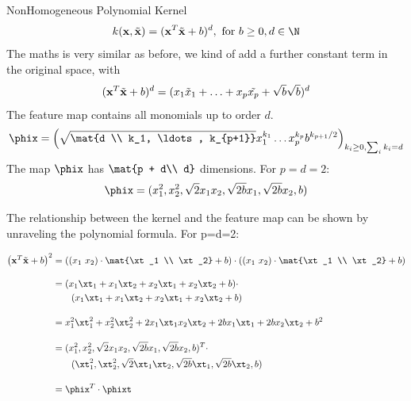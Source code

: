 \documentclass[11pt,compress,t,notes=noshow, xcolor=table]{beamer}
\begin{document}
\begin{vbframe}{NonHomogeneous Polynomial Kernel}
 $$k(\xv, \xtil) = (\xv^T \xtil + b)^d, \text{ for } b\geq 0, d \in \N$$
The maths is very similar as before, we kind of add a further constant term in the original space, with
$$ (\mathbf{x}^T \tilde{\mathbf{x}} + b)^d = (x_1 \tilde{x}_1 + \ldots + x_p \tilde{x_p} + \sqrt{b} \sqrt{b})^d$$
The feature map contains all monomials up to order $d$.
  $$\phix = \left( \sqrt{\mat{d \\ k_1, \ldots, k_{p+1}}} x_1^{k_1} \ldots x_p^{k_p} b^{k_{p+1}/2} \right)_{k_i \geq 0, \sum_i k_i = d}$$
The map $\phix$ has $\mat{p + d\\ d}$ dimensions. For $p=d=2$: 
$$\phix = (x_1^2, x_2^2, \sqrt{2} x_1 x_2, \sqrt{2b} x_1, \sqrt{2b} x_2, b)$$

\framebreak
  The relationship between the kernel and the feature map can be shown by unraveling the polynomial formula. For p=d=2:
  
  \begin{equation*}
    \begin{aligned}
        \left ( \xv^T \xtil + b  \right)^2 &=       \left (   (x_1 \ x_2) \cdot \mat{\xt_1 \\ \xt_2} + b  \right) \cdot      \left ( (x_1 \ x_2)  \cdot \mat{\xt_1 \\ \xt_2}  + b  \right) \\[10pt]
        &= (x_1 \xt_1 + x_1 \xt_2 + x_2 \xt_1 + x_2 \xt_2 + b) \cdot \\
         & \ \ \ \ \ \ (x_1 \xt_1 + x_1 \xt_2 + x_2 \xt_1 + x_2 \xt_2 + b) \\[10pt]
        &= x_1^2 \xt_1^2 + x_2^2 \xt_2^2  +  2  x_1 \xt_1 x_2 \xt_2  + 2 b x_1 \xt_1 + 2 b x_2 \xt_2  + b^2 \\[10pt]
        &= ( x_1^2 , x_2^2 , \sqrt{2} x_1 x_2 , \sqrt{2b} x_1 , \sqrt{2b} x_2 , b )^T \cdot \\
        & \ \ \ \ \ \  ( \xt_1^2 , \xt_2^2 ,\sqrt{2} \xt_1 \xt_2 , \sqrt{2b} \xt_1 , \sqrt{2b} \xt_2 ,  b ) \\[10pt]
        &= \phix^T \cdot \phixt
    \end{aligned}
  \end{equation*}
\end{vbframe}
\end{document}
